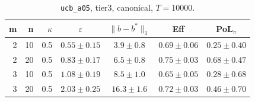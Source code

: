 \begin{table}[htbp]
\centering
\scriptsize
\caption{\texttt{ucb\_a05}, tier3, canonical, $T=10000$.}
\label{tab:tier3_long_ucb_a05}
\begin{tabular}{@{}rrrcccc@{}}
\toprule
m & n & $\kappa$ & $\varepsilon$ & $\|b-b^*\|_1$ & Eff & PoL$_\pi$ \\
\midrule
2 & 10 & 0.5 & $0.55 \pm 0.15$ & $3.9 \pm 0.8$ & $0.69 \pm 0.06$ & $0.25 \pm 0.40$ \\
2 & 20 & 0.5 & $0.83 \pm 0.17$ & $6.5 \pm 0.8$ & $0.75 \pm 0.03$ & $0.68 \pm 0.47$ \\
\midrule
3 & 10 & 0.5 & $1.08 \pm 0.19$ & $8.5 \pm 1.0$ & $0.65 \pm 0.05$ & $0.28 \pm 0.68$ \\
3 & 20 & 0.5 & $2.03 \pm 0.25$ & $16.3 \pm 1.6$ & $0.72 \pm 0.03$ & $0.46 \pm 0.70$ \\
\bottomrule
\end{tabular}
\end{table}
